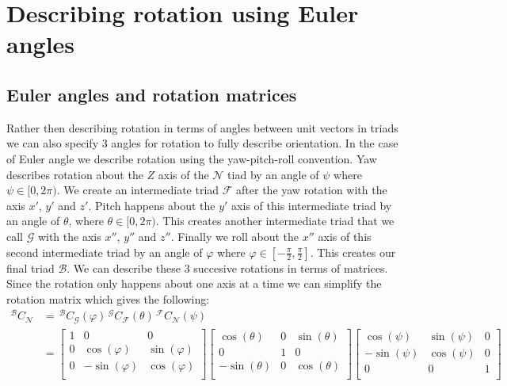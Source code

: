 \documentclass[11pt, a4paper]{article}
\renewcommand*{\phi}{\varphi}
\numberwithin{equation}{section}
\numberwithin{figure}{section}
\begin{document}
\setcounter{section}{5}
\section{Describing rotation using Euler angles}

\subsection{Euler angles and rotation matrices}
Rather then describing rotation in terms of angles between unit vectors in triads we can also specify 3 angles for rotation to fully describe orientation. In the case of Euler angle we describe rotation using the yaw-pitch-roll convention. Yaw describes rotation about the $Z$ axis of the $\mathcal{N}$ tiad by an angle of $\psi$ where $\psi\in[0, 2\pi)$. We create an intermediate triad $\mathcal{F}$ after the yaw rotation with the axis $x'$, $y'$ and $z'$. Pitch happens about the $y'$ axis of this intermediate triad by an angle of $\theta$, where $\theta\in[0, 2\pi)$. This creates another intermediate triad that we call $\mathcal{G}$ with the axis $x''$, $y''$ and $z''$. Finally we roll about the $x''$ axis of this second intermediate triad by an angle of $\phi$ where $\phi\in\left[-\frac{\pi}{2}, \frac{\pi}{2}\right]$. This creates our final triad $\mathcal{B}$. We can describe these 3 succesive rotations in terms of matrices. Since the rotation only happens about one axis at a time we can simplify the rotation matrix which gives the following:
\begin{align}
  ^\mathcal{B}C_\mathcal{N} &= \,^\mathcal{B}C_\mathcal{G}(\phi)\,^\mathcal{G}C_\mathcal{F}(\theta)\,^\mathcal{F}C_\mathcal{N}(\psi)\\
  &= 
  \begin{bmatrix}
    1 & 0 & 0\\
    0 & \cos(\phi) & \sin(\phi)\\
    0 & -\sin(\phi) & \cos(\phi)\\
  \end{bmatrix}
  \begin{bmatrix}
    \cos(\theta) & 0 & \sin(\theta)\\
    0 & 1 & 0\\    
    -\sin(\theta) & 0 & \cos(\theta)\\
  \end{bmatrix}
  \begin{bmatrix}
    \cos(\psi) & \sin(\psi) & 0\\
    -\sin(\psi) & \cos(\psi) & 0\\
    0 & 0 & 1\\
  \end{bmatrix}
\end{align}
\end{document}

